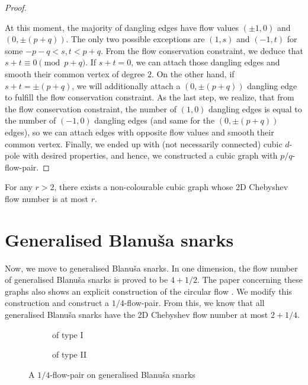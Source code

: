 \begin{proof}
\begin{figure}[h!]
 \captionsetup{labelsep=none}
 \centering
 
 \caption{}
 \label{fig:network1}
\end{figure}

At this moment, the majority of dangling edges have flow values $(\pm 1, 0)$ and $(0, \pm(p+q))$. The only two possible exceptions are $(1, s)$ and $(-1, t)$ for some $-p-q < s, t < p+q$. From the flow conservation constraint, we deduce that $s+t\equiv 0\pmod{p+q}$. If $s+t=0$, we can attach those dangling edges and smooth their common vertex of degree $2$. On the other hand, if $s+t=\pm(p+q)$, we will additionally attach a $(0, \pm(p+q))$ dangling edge to fulfill the flow conservation constraint.
As the last step, we realize, that from the flow conservation constraint, the number of $(1, 0)$ dangling edges is equal to the number of $(-1, 0)$ dangling edges (and same for the $(0, \pm(p+q))$ edges), so we can attach edges with opposite flow values and smooth their common vertex. Finally, we ended up with (not necessarily connected) cubic $d$-pole with desired properties, and hence, we constructed a cubic graph with $p/q$-flow-pair.
\end{proof}

\begin{corollary}
For any $r>2$, there exists a non-colourable cubic graph whose 2D Chebyshev flow number is at most $r$.
\end{corollary}
\section{Generalised Blanuša snarks}
\label{sec:blanusa_construction}

Now, we move to generalised Blanuša snarks. In one dimension, the flow number of generalised Blanuša snarks is proved to be $4+1/2$. The paper concerning these graphs also shows an explicit construction of the circular flow \cite[p. 978]{blanusa_flow_number}. We modify this construction and construct a $1/4$-flow-pair. From this, we know that all generalised Blanuša snarks have the 2D Chebyshev flow number at most $2+1/4$.

\begin{figure}[h!]
\begin{subfigure}{\textwidth}
\centering

\caption{of type I}
\label{fig:FP_first_blanusa}
\end{subfigure}
\begin{subfigure}{\textwidth}
\centering

\caption{of type II}
\label{fig:FP_second_blanusa}
\end{subfigure}
\caption{A $1/4$-flow-pair on generalised Blanuša snarks}
\end{figure}


